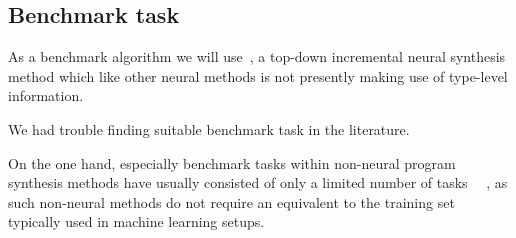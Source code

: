 \documentclass{article}
\begin{document}
\subsection{Benchmark task}


As a benchmark algorithm we will use~\cite{nsps}, a top-down incremental neural synthesis method which like other neural methods is not presently making use of type-level information.


We had trouble finding suitable benchmark task in the literature.

On the one hand, especially benchmark tasks within non-neural program synthesis methods have usually consisted of only a limited number of tasks%
~\citep{myth,lambda2,typedmil,houdini,tamandu,dilp}~\cite{terpret},
as such non-neural methods do not require an equivalent to the training set typically used in machine learning setups.
\end{document}
